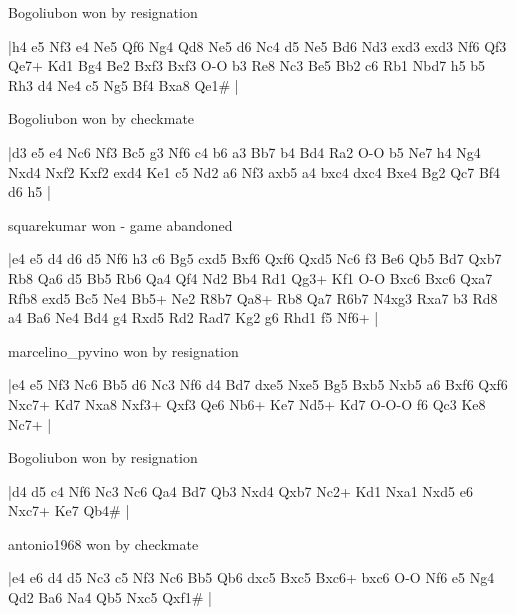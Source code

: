 \showboard

Bogoliubon won by resignation

\makegametitle
|h4 e5 Nf3 e4 Ne5 Qf6 Ng4 Qd8 Ne5 d6 Nc4 d5 Ne5 Bd6 Nd3 exd3 exd3 Nf6 Qf3 Qe7+ Kd1 Bg4 Be2 Bxf3 Bxf3 O-O b3 Re8 Nc3 Be5 Bb2 c6 Rb1 Nbd7 h5 b5 Rh3 d4 Ne4 c5 Ng5 Bf4 Bxa8 Qe1\#  |

\showboard

Bogoliubon won by checkmate

\makegametitle
|d3 e5 e4 Nc6 Nf3 Bc5 g3 Nf6 c4 b6 a3 Bb7 b4 Bd4 Ra2 O-O b5 Ne7 h4 Ng4 Nxd4 Nxf2 Kxf2 exd4 Ke1 c5 Nd2 a6 Nf3 axb5 a4 bxc4 dxc4 Bxe4 Bg2 Qc7 Bf4 d6 h5  |

\showboard

squarekumar won - game abandoned

\makegametitle
|e4 e5 d4 d6 d5 Nf6 h3 c6 Bg5 cxd5 Bxf6 Qxf6 Qxd5 Nc6 f3 Be6 Qb5 Bd7 Qxb7 Rb8 Qa6 d5 Bb5 Rb6 Qa4 Qf4 Nd2 Bb4 Rd1 Qg3+ Kf1 O-O Bxc6 Bxc6 Qxa7 Rfb8 exd5 Bc5 Ne4 Bb5+ Ne2 R8b7 Qa8+ Rb8 Qa7 R6b7 N4xg3 Rxa7 b3 Rd8 a4 Ba6 Ne4 Bd4 g4 Rxd5 Rd2 Rad7 Kg2 g6 Rhd1 f5 Nf6+  |

\showboard

marcelino\_pyvino won by resignation

\makegametitle
|e4 e5 Nf3 Nc6 Bb5 d6 Nc3 Nf6 d4 Bd7 dxe5 Nxe5 Bg5 Bxb5 Nxb5 a6 Bxf6 Qxf6 Nxc7+ Kd7 Nxa8 Nxf3+ Qxf3 Qe6 Nb6+ Ke7 Nd5+ Kd7 O-O-O f6 Qc3 Ke8 Nc7+  |

\showboard

Bogoliubon won by resignation

\makegametitle
|d4 d5 c4 Nf6 Nc3 Nc6 Qa4 Bd7 Qb3 Nxd4 Qxb7 Nc2+ Kd1 Nxa1 Nxd5 e6 Nxc7+ Ke7 Qb4\#  |

\showboard

antonio1968 won by checkmate

\makegametitle
|e4 e6 d4 d5 Nc3 c5 Nf3 Nc6 Bb5 Qb6 dxc5 Bxc5 Bxc6+ bxc6 O-O Nf6 e5 Ng4 Qd2 Ba6 Na4 Qb5 Nxc5 Qxf1\#  |

\showboard

